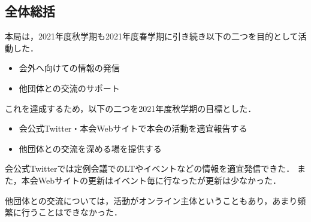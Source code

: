 \subsection*{全体総括}


本局は，2021年度秋学期も2021年度春学期に引き続き以下の二つを目的として活動した．
\begin{itemize}
    \item 会外へ向けての情報の発信
    \item 他団体との交流のサポート
\end{itemize}
これを達成するため，以下の二つを2021年度秋学期の目標とした．
\begin{itemize}
    \item 会公式Twitter・本会Webサイトで本会の活動を適宜報告する
    \item 他団体との交流を深める場を提供する
\end{itemize}

会公式Twitterでは定例会議でのLTやイベントなどの情報を適宜発信できた．
また，本会Webサイトの更新はイベント毎に行なったが更新は少なかった．

他団体との交流については，活動がオンライン主体ということもあり，あまり頻繁に行うことはできなかった．